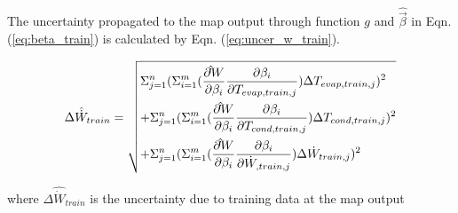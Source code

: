 The uncertainty propagated to the map output through function $g$ and $\hat{ \vec {\beta}}$ in Eqn. (\ref{eq:beta_train}) is calculated by Eqn. (\ref{eq:uncer_w_train}).

\begin{equation}
\Delta {\hat{\dot{W}}_{train}} = \sqrt{\begin{gathered}
  \Sigma_{j=1}^n(\Sigma _{i = 1}^m(\frac{{\partial \hat \dot W}}{{\partial {\beta _i}}}\frac{{\partial {\beta _i}}}{{\partial {T_{evap,train,j}}}})\Delta {T_{evap,train,j}})^2  \hfill \\
  +\Sigma_{j=1}^n(\Sigma _{i = 1}^m(\frac{{\partial \hat \dot W}}{{\partial {\beta _i}}}\frac{{\partial {\beta _i}}}{{\partial {T_{cond,train,j}}}})\Delta {T_{cond,train,j}})^2 \hfill \\
   +\Sigma_{j=1}^n(\Sigma _{i = 1}^m(\frac{{\partial \hat \dot W}}{{\partial {\beta _i}}}\frac{{\partial {\beta _i}}}{{\partial {\dot{W}_{,train,j}}}})\Delta {\dot{W}_{train,j}})^2 \hfill \\ 
\end{gathered}}
\label{eq:uncer_w_train}
\end{equation}

where $\Delta {\hat{\dot{W}}_{train}}$ is the uncertainty due to training data at the map output
